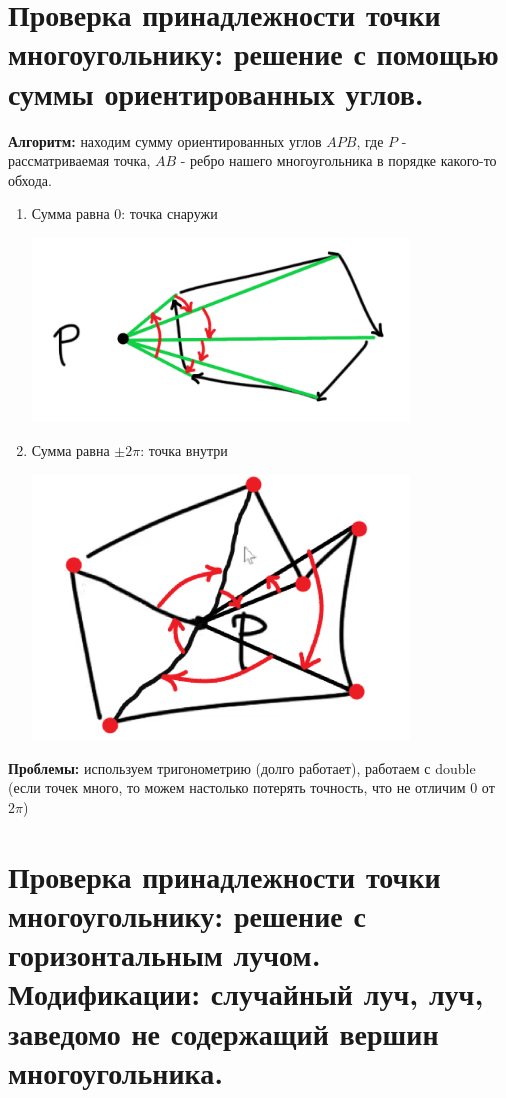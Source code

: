 \section{Проверка принадлежности точки многоугольнику: решение с помощью суммы ориентированных углов.}
\par \textbf{Алгоритм:} находим сумму ориентированных углов $APB$, где $P$ - рассматриваемая точка, $AB$ - ребро нашего многоугольника в порядке какого-то обхода. \begin{enumerate}
    \item Сумма равна 0: точка снаружи
    \par \includegraphics[width=10cm]{images/point_in_polygon_sum_0.png}
    \item Сумма равна $\pm 2\pi$: точка внутри
    \par \includegraphics[width=10cm]{images/point_in_polygon_sum_2pi.png}
\end{enumerate}
\par \textbf{Проблемы:} используем тригонометрию (долго работает), работаем с double (если точек много, то можем настолько потерять точность, что не отличим 0 от $2\pi$)
\newpage{}

\section{Проверка принадлежности точки многоугольнику: решение с горизонтальным лучом. Модификации: случайный луч, луч, заведомо не содержащий вершин многоугольника.}

